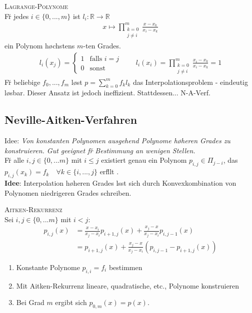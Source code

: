 \textsc{Lagrange-Polynome}\\
F\u r jedes $i \in \{0,...,m\}$ ist $l_i : \mathbb{R} \rightarrow \mathbb{R}$
\begin{align*}
x \mapsto \prod_{\substack{k=0 \\ j\neq i}}^m \frac{x-x_k}{x_i - x_k}
\end{align*}
ein Polynom h\o chstens $m$-ten Grades. 
\begin{align*}
l_i(x_j) = \begin{cases}
1 & \text{falls } i=j \\
0 & \text{sonst}
\end{cases}
\qquad 
l_i(x_i) = \prod_{\substack{k=0 \\ j\neq i}}^m \frac{x_i-x_k}{x_i - x_k} = 1
\end{align*}
F\u r beliebige $f_0, ..., f_m$ l\o st $p=\sum_{k=0}^m f_kl_k$ das Interpolationsproblem - eindeutig l\o sbar. Dieser Ansatz ist jedoch ineffizient. 
Stattdessen... N-A-Verf.

\subsection{Neville-Aitken-Verfahren}
Idee: \emph{Von konstanten Polynomen ausgehend Polynome h\o heren Grades zu konstruieren. Gut geeignet f\u r Bestimmung an wenigen Stellen.}\\
F\u r alle $i,j \in \{0,...m\}$ mit $i\leq j$ existiert genau ein Polynom $p_{i,j} \in \Pi_{j-i}$, das $p_{i,j}(x_k) = f_k \quad \forall k \in \{i,...,j\}$ erf\u llt .\\
\textbf{Idee}: Interpolation h\o heren Grades l\a sst sich durch Konvexkombination von Polynomen niedrigeren Grades schreiben.\vspace{0.2cm}

\textsc{Aitken-Rekurrenz}\\
Sei $i,j \in \{0,...m\}$ mit $i < j$:
\begin{align*}
p_{i,j}(x) &= \frac{x-x_i}{x_j-x_i} p_{i+1,j}(x) + \frac{x_j-x}{x_j-x_i}p_{i,j-1}(x) \\
&= p_{i+1,j}(x) + \frac{x_j-x}{x_j-x_i} (p_{i,j-1} - p_{i+1,j}(x))
\end{align*}
\begin{enumerate}
\item Konstante Polynome $p_{i,i} = f_i$ bestimmen
\item Mit Aitken-Rekurrenz lineare, quadratische, etc., Polynome konstruieren
\item Bei Grad $m$ ergibt sich $p_{0,m}(x) = p(x)$.
\end{enumerate}

